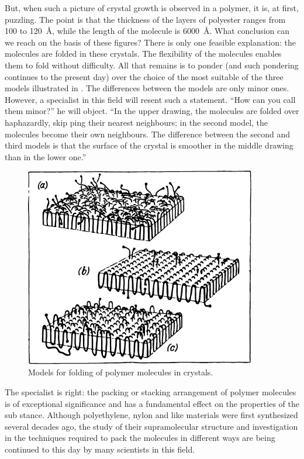 But, when such a picture of crystal growth is observed in a polymer, it is, at first, puzzling. The point is that the thickness of the layers of polyester ranges from 100 to \SI{120}{\angstrom}, while the length of the molecule is \SI{6000}{\angstrom}. What conclusion can we reach on the basis of these fig­ures? There is only one feasible explanation: the molecules are folded in these crystals. The flexibility of the mole­cules enables them to fold without difficulty. All that re­mains is to ponder (and such pondering continues to the present day) over the choice of the most suitable of the three models illustrated in . The differences between the models are only minor ones. However, a spe­cialist in this field will resent such a statement. ``How can you call them minor?'' he will object. ``In the upper drawing, the molecules are folded over haphazardly, skip­ ping their nearest neighbours; in the second model, the molecules become their own neighbours. The difference between the second and third models is that the surface of the crystal is smoother in the middle drawing than in the lower one.''

\begin{figure}[!ht]
\centering
\includegraphics[width=0.9\textwidth]{figures/fig-09-06.pdf}
\caption{Models for folding of polymer molecules in crystals.}
\label{fig-9.6}
\end{figure}

The specialist is right: the packing or stacking arrange­ment of polymer molecules is of exceptional significance and has a fundamental effect on the properties of the sub­ stance. Although polyethylene, nylon and like materials were first synthesized several decades ago, the study of their supramolecular structure and investigation in the techniques required to pack the molecules in different ways are being continued to this day by many scientists in this field.

